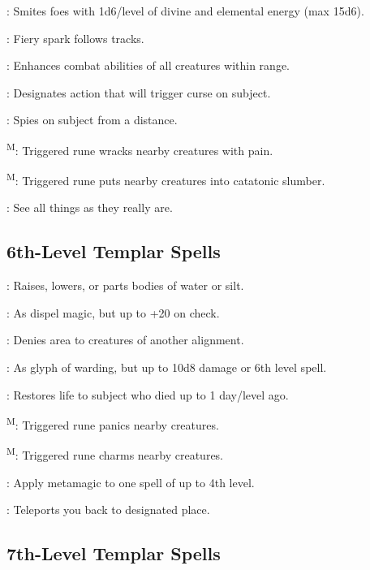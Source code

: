 : Smites foes with 1d6/level of divine and elemental energy (max 15d6).

: Fiery spark follows tracks.

: Enhances combat abilities of all creatures within range.

: Designates action that will trigger curse on subject.

: Spies on subject from a distance.

\textsuperscript{M}: Triggered rune wracks nearby creatures with pain.

\textsuperscript{M}: Triggered rune puts nearby creatures into catatonic slumber.

: See all things as they really are.



\subsection{6th-Level Templar Spells}

: Raises, lowers, or parts bodies of water or silt.

: As dispel magic, but up to +20 on check.

: Denies area to creatures of another alignment.

: As glyph of warding, but up to 10d8 damage or 6th level spell.

: Restores life to subject who died up to 1 day/level ago.

\textsuperscript{M}: Triggered rune panics nearby creatures.

\textsuperscript{M}: Triggered rune charms nearby creatures.

: Apply metamagic to one spell of up to 4th level.

: Teleports you back to designated place.



\subsection{7th-Level Templar Spells}

